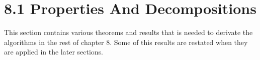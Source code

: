 \section*{8.1 Properties And Decompositions}

This section contains various theorems and results that is needed to derivate the algorithms
in the rest of chapter 8. Some of this results are restated when 
they are applied in the later sections.
